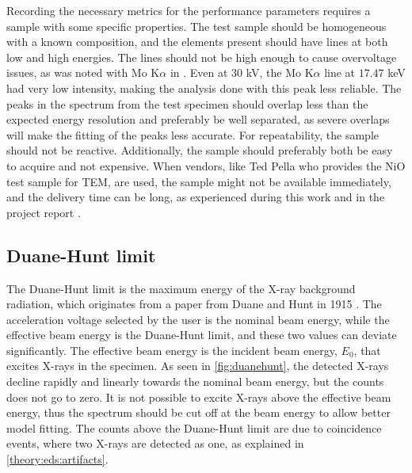 Recording the necessary metrics for the performance parameters requires a sample with some specific properties.
The test sample should be homogeneous with a known composition, and the elements present should have lines at both low and high energies.
The lines should not be high enough to cause overvoltage issues, as was noted with Mo K$\alpha$ in \cite{project_report}.
Even at $30$ kV, the Mo K$\alpha$ line at $17.47$ keV had very low intensity, making the analysis done with this peak less reliable.
The peaks in the spectrum from the test specimen should overlap less than the expected energy resolution and preferably be well separated, as severe overlaps will make the fitting of the peaks less accurate.
For repeatability, the sample should not be reactive.
Additionally, the sample should preferably both be easy to acquire and not expensive.
When vendors, like Ted Pella who provides the NiO test sample for TEM, are used, the sample might not be available immediately, and the delivery time can be long, as experienced during this work and in the project report \cite{project_report}.






\subsection{Duane-Hunt limit}
\label{theory:eds_performance:duanehunt}

The Duane-Hunt limit is the maximum energy of the X-ray background radiation, which originates from a paper from Duane and Hunt in 1915 \cite{Duane_Hunt_1915}.
The acceleration voltage selected by the user is the nominal beam energy, while the effective beam energy is the Duane-Hunt limit, and these two values can deviate significantly.
The effective beam energy is the incident beam energy, $E_0$, that excites X-rays in the specimen.
As seen in \cref{fig:duanehunt}, the detected X-rays decline rapidly and linearly towards the nominal beam energy, but the counts does not go to zero.
It is not possible to excite X-rays above the effective beam energy, thus the spectrum should be cut off at the beam energy to allow better model fitting.
The counts above the Duane-Hunt limit are due to coincidence events, where two X-rays are detected as one, as explained in \cref{theory:eds:artifacts}.


